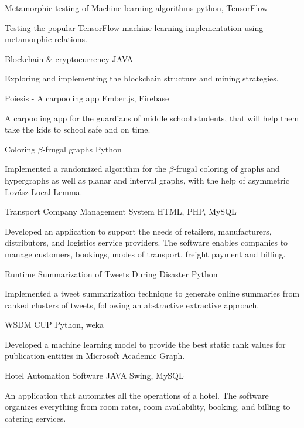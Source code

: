 \documentclass{tccv}
\begin{document}
\begin{projectlist}

\item{Metamorphic testing of Machine learning algorithms}
     {python, TensorFlow}

Testing the popular TensorFlow machine learning implementation using metamorphic relations.

\item{Blockchain \& cryptocurrency}
     {JAVA}

Exploring and implementing the blockchain structure and mining strategies.

\item{Poiesis - A carpooling app}
     {Ember.js, Firebase}

A carpooling app for the guardians of middle school students, that will help them take the kids to school safe and on time.

\item{Coloring $\beta$-frugal graphs}
     {Python}

Implemented a randomized algorithm for the $\beta$-frugal coloring of graphs and hypergraphs as well as planar and interval graphs, with the help of asymmetric Lov\'{a}sz Local Lemma.


\item{Transport Company Management System}
     {HTML, PHP, MySQL}

Developed an application to support the needs of retailers, manufacturers, distributors, and logistics service providers. The software enables companies to manage customers, bookings, modes of transport, freight payment and billing.

\item{Runtime Summarization of Tweets During Disaster}
     {Python}

Implemented a tweet summarization technique to generate online summaries from ranked clusters of tweets, following an abstractive extractive approach.

\item{WSDM CUP}
     {Python, weka}

Developed a machine learning model to  provide the best static rank values for publication entities in Microsoft Academic Graph.

\item{Hotel Automation Software}
     {JAVA Swing, MySQL}

An application that automates all the operations of a hotel. The software organizes everything from room rates, room availability, booking, and billing to catering services.



\end{projectlist}
\end{document}
